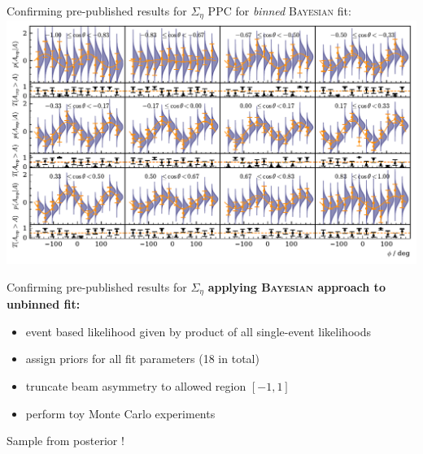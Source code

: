 \documentclass[11pt,aspectratio=169,dvipsnames]{beamer}
\begin{document}
	\begin{frame}{Confirming pre-published results for $\Sigma_\eta$}
	PPC for \emph{binned} \textsc{Bayesian} fit:
	\centering
	\includegraphics[width=.9\linewidth]{../../bayes/realdeal/plots/ppd_checks.pdf}
\end{frame}
		\begin{frame}{Confirming pre-published results for $\Sigma_\eta$}
\textbf{		applying \textsc{Bayesian} approach to unbinned fit:}
		\begin{itemize}
			\item event based likelihood given by product of all single-event likelihoods 
			\item assign priors for all fit parameters (18 in total)
			\item truncate beam asymmetry to allowed region $[-1,1]$
			\item perform toy Monte Carlo experiments
		\end{itemize}
		Sample from posterior !
	\end{frame}
	
\end{document}
